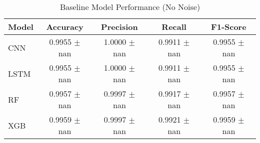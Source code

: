 
\begin{table}[htbp]
\centering
\caption{Baseline Model Performance (No Noise)}
\begin{tabular}{lcccc}
\hline
Model & Accuracy & Precision & Recall & F1-Score \\
\hline
CNN & 0.9955 $\pm$ nan & 1.0000 $\pm$ nan & 0.9911 $\pm$ nan & 0.9955 $\pm$ nan \\
LSTM & 0.9955 $\pm$ nan & 1.0000 $\pm$ nan & 0.9911 $\pm$ nan & 0.9955 $\pm$ nan \\
RF & 0.9957 $\pm$ nan & 0.9997 $\pm$ nan & 0.9917 $\pm$ nan & 0.9957 $\pm$ nan \\
XGB & 0.9959 $\pm$ nan & 0.9997 $\pm$ nan & 0.9921 $\pm$ nan & 0.9959 $\pm$ nan \\
\hline
\end{tabular}
\label{tab:baseline_performance}
\end{table}

